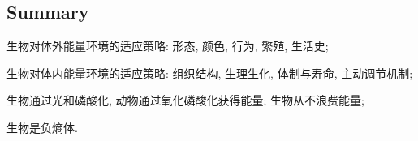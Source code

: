 \documentclass{ctexart}
\begin{document}

\subsection{Summary} %
\label{sub:summary}

\begin{cenum}
    \item 生物对体外能量环境的适应策略: 形态, 颜色, 行为, 繁殖, 生活史;
    \item 生物对体内能量环境的适应策略: 组织结构, 生理生化, 体制与寿命, 主动调节机制;
    \item 生物通过光和磷酸化, 动物通过氧化磷酸化获得能量; 生物从不浪费能量;
    \item 生物是负熵体.
\end{cenum}


\end{document}
